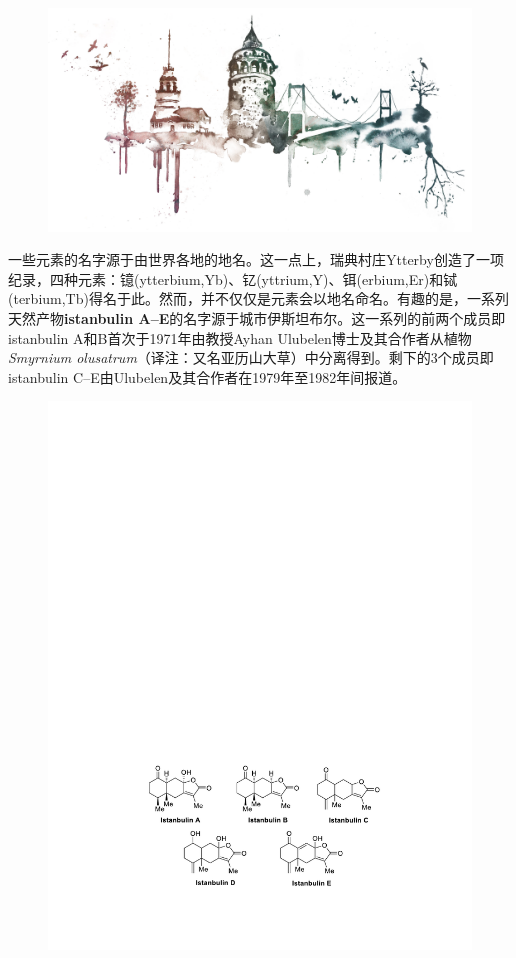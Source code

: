 \begin{figure}[h]
	\centering
	\includegraphics[width=16cm]{./pic/t2-1.jpg}
\end{figure}

一些元素的名字源于由世界各地的地名。这一点上，瑞典村庄Ytterby创造了一项纪录，四种元素：镱(ytterbium,Yb)、钇(yttrium,Y)、铒(erbium,Er)和铽(terbium,Tb)得名于此。然而，并不仅仅是元素会以地名命名。有趣的是，一系列天然产物\textbf{istanbulin A--E}的名字源于城市伊斯坦布尔。这一系列的前两个成员即istanbulin A和B首次于1971年由教授Ayhan Ulubelen博士及其合作者从植物\emph{Smyrnium olusatrum}（译注：又名亚历山大草）中分离得到。剩下的3个成员即istanbulin C--E由Ulubelen及其合作者在1979年至1982年间报道。

\begin{figure}[h]
	\centering
	\includegraphics[width=12cm]{./pic/t2-2.pdf}
\end{figure}

